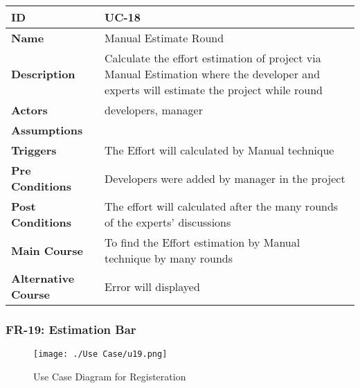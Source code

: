     \begin{center}
        \begin{tabularx}{\textwidth}{|l|X|}
            \hline
            \textbf{ID} & UC-18 \\
            \hline
            \textbf{Name} & Manual Estimate Round \\
            \hline
            \textbf{Description} & Calculate the effort estimation of project via Manual Estimation where the developer and experts will estimate the project while round \\
            \hline
            \textbf{Actors} & developers, manager \\
            \hline
            \textbf{Assumptions} &  \\
            \hline
            \textbf{Triggers} & The Effort will calculated by Manual technique \\
            \hline
            \textbf{Pre Conditions} & Developers were added by manager  in the project \\
            \hline
            \textbf{Post Conditions} & The effort will calculated after the many rounds of the experts' discussions  \\
            \hline
            \textbf{Main Course} & To find the Effort estimation by Manual technique by many rounds \\
            \hline
            \textbf{Alternative Course} & Error will displayed \\
            \hline
            
        \end{tabularx}
    \end{center}
    
    \newpage

    \subsubsection{FR-19: Estimation Bar}
    \begin{figure}[H]
        \texttt{[image: ./Use Case/u19.png]}
        \centering 
        \caption{Use Case Diagram for Registeration}
        \label{fig:prototype1}
        \end{figure}
        
